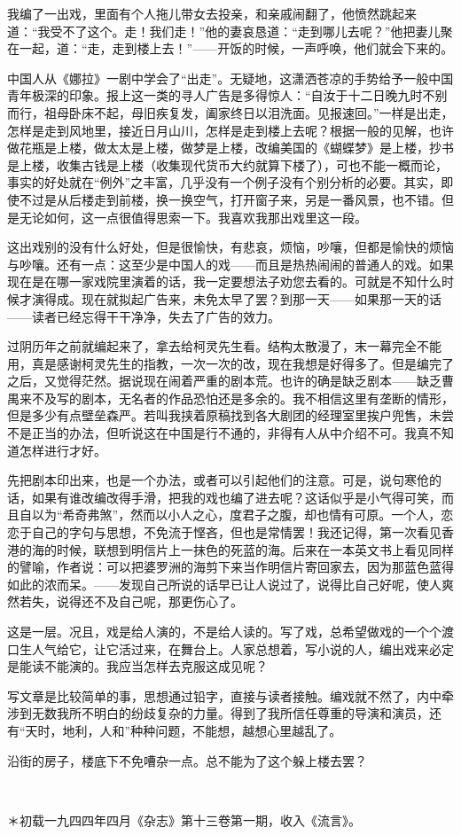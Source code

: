\par 我编了一出戏，里面有个人拖儿带女去投亲，和亲戚闹翻了，他愤然跳起来道：“我受不了这个。走！我们走！”他的妻哀恳道：“走到哪儿去呢？”他把妻儿聚在一起，道：“走，走到楼上去！”——开饭的时候，一声呼唤，他们就会下来的。
\par 中国人从《娜拉》一剧中学会了“出走”。无疑地，这潇洒苍凉的手势给予一般中国青年极深的印象。报上这一类的寻人广告是多得惊人：“自汝于十二日晚九时不别而行，祖母卧床不起，母旧疾复发，阖家终日以泪洗面。见报速回。”一样是出走，怎样是走到风地里，接近日月山川，怎样是走到楼上去呢？根据一般的见解，也许做花瓶是上楼，做太太是上楼，做梦是上楼，改编美国的《蝴蝶梦》是上楼，抄书是上楼，收集古钱是上楼（收集现代货币大约就算下楼了），可也不能一概而论，事实的好处就在“例外”之丰富，几乎没有一个例子没有个别分析的必要。其实，即使不过是从后楼走到前楼，换一换空气，打开窗子来，另是一番风景，也不错。但是无论如何，这一点很值得思索一下。我喜欢我那出戏里这一段。
\par 这出戏别的没有什么好处，但是很愉快，有悲哀，烦恼，吵嚷，但都是愉快的烦恼与吵嚷。还有一点：这至少是中国人的戏——而且是热热闹闹的普通人的戏。如果现在是在哪一家戏院里演着的话，我一定要想法子劝您去看的。可就是不知什么时候才演得成。现在就拟起广告来，未免太早了罢？到那一天——如果那一天的话——读者已经忘得干干净净，失去了广告的效力。
\par 过阴历年之前就编起来了，拿去给柯灵先生看。结构太散漫了，末一幕完全不能用，真是感谢柯灵先生的指教，一次一次的改，现在我想是好得多了。但是编完了之后，又觉得茫然。据说现在闹着严重的剧本荒。也许的确是缺乏剧本——缺乏曹禺来不及写的剧本，无名者的作品恐怕还是多余的。我不相信这里有垄断的情形，但是多少有点壁垒森严。若叫我挟着原稿找到各大剧团的经理室里挨户兜售，未尝不是正当的办法，但听说这在中国是行不通的，非得有人从中介绍不可。我真不知道怎样进行才好。
\par 先把剧本印出来，也是一个办法，或者可以引起他们的注意。可是，说句寒伧的话，如果有谁改编改得手滑，把我的戏也编了进去呢？这话似乎是小气得可笑，而且自以为“希奇弗煞”，然而以小人之心，度君子之腹，却也情有可原。一个人，恋恋于自己的字句与思想，不免流于悭吝，但也是常情罢！我还记得，第一次看见香港的海的时候，联想到明信片上一抹色的死蓝的海。后来在一本英文书上看见同样的譬喻，作者说：可以把婆罗洲的海剪下来当作明信片寄回家去，因为那蓝色蓝得如此的浓而呆。——发现自己所说的话早已让人说过了，说得比自己好呢，使人爽然若失，说得还不及自己呢，那更伤心了。
\par 这是一层。况且，戏是给人演的，不是给人读的。写了戏，总希望做戏的一个个渡口生人气给它，让它活过来，在舞台上。人家总想着，写小说的人，编出戏来必定是能读不能演的。我应当怎样去克服这成见呢？
\par 写文章是比较简单的事，思想通过铅字，直接与读者接触。编戏就不然了，内中牵涉到无数我所不明白的纷歧复杂的力量。得到了我所信任尊重的导演和演员，还有“天时，地利，人和”种种问题，不能想，越想心里越乱了。
\par 沿街的房子，楼底下不免嘈杂一点。总不能为了这个躲上楼去罢？
\par  
\par ＊初载一九四四年四月《杂志》第十三卷第一期，收入《流言》。


